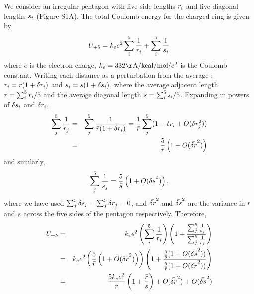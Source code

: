 \documentclass[9pt,onecolumn,oneside,lineno]{pnas-new}
\begin{document}
\newcommand{\avgside}{\bar{\side}}
\newcommand{\avgdiag}{\bar{\diag}}
\newcommand{\avginvside}{\bar{\side^{-1}}}
\newcommand{\avginvdiag}{\bar{\diag^{-1}}}
\newcommand{\avgsidevar}{\bar{\delta\side}^{2}}
\newcommand{\avgdiagvar}{\bar{\delta\diag}^{2}}
We consider an irregular pentagon with five side lengths $r_{i}$ and five diagonal lengths $s_{i}$ (Figure S1A).  The total Coulomb energy for the charged ring is given by 
\begin{equation}
U_{+5} = { k_{e} e^{2}}\sum_{i}^{5}\frac{1}{ r_{i}}+ \sum_{i}^{5}\frac{1}{ s_{i}}
\end{equation} 
where $e$ is the electron charge, $k_{e} = 332 \mathrm{\AA/kcal/mol}/e^{2}$ is the Coulomb constant. Writing each distance as a perturbation from the average : $\side_{i} = \avgside(1 + \delta\side_{i})$ and $\diag_{i} = \avgdiag(1 + \delta\diag_{i})$, where the average adjacent length $\avgside = \sum_{i}^{5} \side_{i}/5$ and the average diagonal length $\avgdiag = \sum_{i}^{5} \diag_{i}/5$.  Expanding in powers of $\delta s_{i}$ and $\delta r_{i}$,  
\begin{eqnarray}
\sum_{j}^{5}\frac{1}{ \side_{j}} & = & \sum_{j}^{5}\frac{1}{\avgside(1 + \delta\side_{i}) }  = \frac{1}{\avgside}\sum_{j}^{5}(1 - \delta\side_{i} + O( \delta\side_{j}^{2}))\\
& = & \frac{5}{\avgside}\left(1 + O(\avgsidevar)\right)
\end{eqnarray}
and similarly, \begin{equation}
\sum_{j}^{5}\frac{1}{ \diag_{j}}  = \frac{5}{\avgdiag}\left(1 + O(\avgdiagvar)\right),
\end{equation} 
where we have used $\sum_{j}^{5}{\delta s_{j}} = \sum_{j}^{5}{\delta r_{j}} = 0$, and $\avgsidevar$ and $\avgdiagvar$ are the variance in $r$ and $s$ across the five sides of the pentagon respectively.  
Therefore, 
\begin{eqnarray}
U_{+5}& =& { k_{e} e^{2}}\left(\sum_{i}^{5}\frac{1}{ \side_{i}}\right)\left( 1+ \frac{\sum_{j}^{5}\frac{1}{ \diag_{j}}}{\sum_{j}^{5}\frac{1}{ \side_{j}} }\right)\\
& = &  { k_{e} e^{2}}\left( \frac{5}{\avgside}\left(1 + O(\avgsidevar)\right)\right)
\left( 1+  \frac{\frac{5}{\avgdiag}(1 + O(\avgdiagvar))}{\frac{5}{\avgside}(1 + O(\avgsidevar))} \right)\\
&=& \frac{ 5 k_{e} e^{2}}{\avgside}
\left( 1+  \frac{\avgside}{\avgdiag}\right) + O(\avgsidevar)+ O(\avgdiagvar)
\end{eqnarray} 
\end{document}
